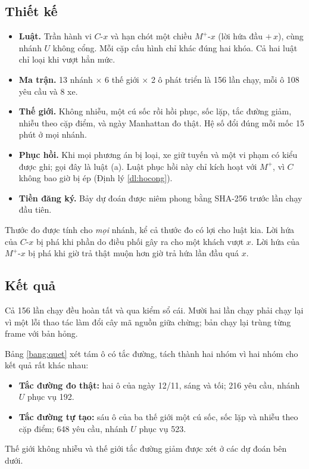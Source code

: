 \subsection{Thiết kế}

\begin{itemize}
\item \textbf{Luật.} Trần hành vi $C$-$x$ và hạn chót một chiều $M^{+}$-$x$ (lời hứa đầu $+\,x$), cùng
nhánh $U$ không cổng. Mỗi cặp cấu hình chỉ khác đúng hai khóa. Cả hai luật chỉ loại khi vượt hẳn mức.
\item \textbf{Ma trận.} 13 nhánh $\times$ 6 thế giới $\times$ 2 ô phát triển là 156 lần chạy, mỗi ô 108
yêu cầu và 8 xe.
\item \textbf{Thế giới.} Không nhiễu, một cú sốc rồi hồi phục, sốc lặp, tắc đường giảm, nhiễu theo cặp
điểm, và ngày Manhattan đo thật. Hệ số đổi đúng mỗi mốc 15 phút ở mọi nhánh.
\item \textbf{Phục hồi.} Khi mọi phương án bị loại, xe giữ tuyến và một vi phạm có kiểu được ghi; gọi
đây là luật (a). Luật phục hồi này chỉ kích hoạt với $M^{+}$, vì $C$ không bao giờ bị ép (Định lý
\ref{dl:hocong}).
\item \textbf{Tiền đăng ký.} Bảy dự đoán được niêm phong bằng SHA-256 trước lần chạy đầu tiên.
\end{itemize}

Thước đo được tính cho \emph{mọi} nhánh, kể cả thước đo có lợi cho luật kia. Lời hứa của $C$-$x$ bị phá
khi phần do điều phối gây ra cho một khách vượt $x$. Lời hứa của $M^{+}$-$x$ bị phá khi giờ trả thật muộn
hơn giờ trả hứa lần đầu quá $x$.

\subsection{Kết quả}

Cả 156 lần chạy đều hoàn tất và qua kiểm sổ cái. Mười hai lần chạy phải chạy lại vì một lỗi thao tác
làm đổi cây mã nguồn giữa chừng; bản chạy lại trùng từng frame với bản hỏng.

Bảng \ref{bang:quet} xét tám ô có tắc đường, tách thành hai nhóm vì hai nhóm cho kết quả rất khác
nhau:
\begin{itemize}
\item \textbf{Tắc đường đo thật:} hai ô của ngày 12/11, sáng và tối; 216 yêu cầu, nhánh $U$ phục vụ 192.
\item \textbf{Tắc đường tự tạo:} sáu ô của ba thế giới một cú sốc, sốc lặp và nhiễu theo cặp điểm;
648 yêu cầu, nhánh $U$ phục vụ 523.
\end{itemize}
Thế giới không nhiễu và thế giới tắc đường giảm được xét ở các dự đoán bên dưới.

